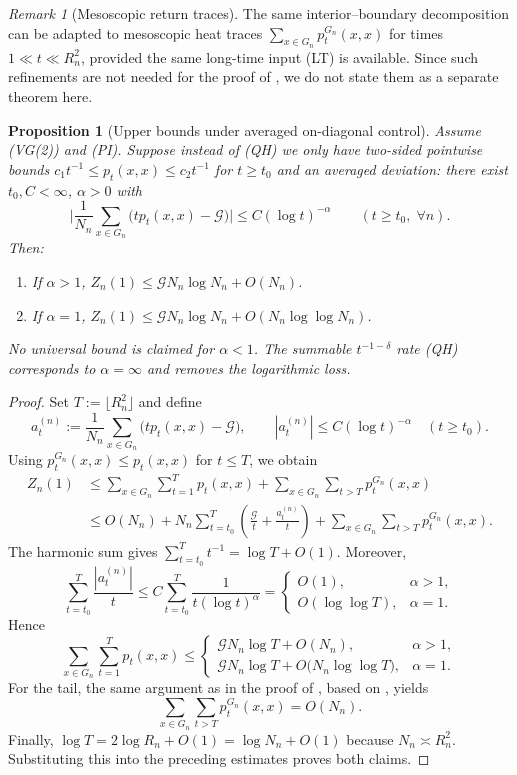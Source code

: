 \documentclass[reqno]{amsart}
\numberwithin{equation}{section}
\newtheorem{proposition}[proposition]{Proposition}
\theoremstyle{definition}
\theoremstyle{remark}
\newtheorem{remark}[remark]{Remark}
\newcommand{\cG}{\mathcal{G}}
\begin{document}
\begin{remark}[Mesoscopic return traces]\label{cor:heat_trace}
The same interior--boundary decomposition can be adapted to mesoscopic heat traces $\sum_{x\in G_n}p_t^{G_n}(x,x)$ for times $1\ll t\ll R_n^2$, provided the same long-time input (LT) is available. Since such refinements are not needed for the proof of , we do not state them as a separate theorem here.
\end{remark}

\begin{proposition}[Upper bounds under averaged on-diagonal control]\label{prop:weaker_remainder}
Assume (VG(2)) and (PI). Suppose instead of (QH) we only have two-sided pointwise bounds $c_1 t^{-1}\le p_t(x,x)\le c_2 t^{-1}$ for $t\ge t_0$ and an averaged deviation: there exist $t_0,C<\infty$, $\alpha>0$ with
\[
  \Big| \frac{1}{N_n} \sum_{x\in G_n} \Big( t p_t(x,x) - \cG \Big) \Big| \le C (\log t)^{-\alpha}\qquad(t\ge t_0,\;\forall n).
\]
Then:
\begin{enumerate}
  \item If $\alpha>1$, $Z_n(1)\le\cG N_n \log N_n + O(N_n)$.
  \item If $\alpha=1$, $Z_n(1)\le\cG N_n \log N_n + O(N_n \log\log N_n)$.
\end{enumerate}
\emph{No universal bound is claimed for $\alpha<1$.} The summable $t^{-1-\delta}$ rate (QH) corresponds to $\alpha=\infty$ and removes the logarithmic loss.
\end{proposition}
\begin{proof}
Set $T:=\lfloor R_n^2\rfloor$ and define
\[
  a_t^{(n)}:=\frac1{N_n}\sum_{x\in G_n}\bigl(t p_t(x,x)-\cG\bigr),
  \qquad |a_t^{(n)}|\le C(\log t)^{-\alpha}\quad (t\ge t_0).
\]
Using $p_t^{G_n}(x,x)\le p_t(x,x)$ for $t\le T$, we obtain
\begin{align*}
Z_n(1)
&\le \sum_{x\in G_n}\sum_{t=1}^{T} p_t(x,x)
   + \sum_{x\in G_n}\sum_{t>T} p_t^{G_n}(x,x) \\
&\le O(N_n) + N_n\sum_{t=t_0}^{T}\left(\frac{\cG}{t}+\frac{a_t^{(n)}}{t}\right)
   + \sum_{x\in G_n}\sum_{t>T} p_t^{G_n}(x,x).
\end{align*}
The harmonic sum gives $\sum_{t=t_0}^{T} t^{-1}=\log T+O(1)$. Moreover,
\[
\sum_{t=t_0}^{T}\frac{|a_t^{(n)}|}{t}
\le C\sum_{t=t_0}^{T}\frac{1}{t(\log t)^{\alpha}}
=
\begin{cases}
O(1), & \alpha>1,\\[2mm]
O(\log\log T), & \alpha=1.
\end{cases}
\]
Hence
\[
\sum_{x\in G_n}\sum_{t=1}^{T} p_t(x,x)
\le
\begin{cases}
\cG N_n\log T + O(N_n), & \alpha>1,\\[2mm]
\cG N_n\log T + O\bigl(N_n\log\log T\bigr), & \alpha=1.
\end{cases}
\]
For the tail, the same argument as in the proof of , based on , yields
\[
\sum_{x\in G_n}\sum_{t>T} p_t^{G_n}(x,x)=O(N_n).
\]
Finally, $\log T = 2\log R_n + O(1) = \log N_n + O(1)$ because $N_n\asymp R_n^2$. Substituting this into the preceding estimates proves both claims.
\end{proof}
\end{document}
